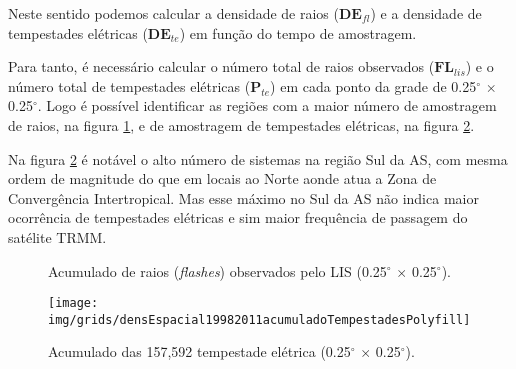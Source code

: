 
Neste sentido podemos calcular a densidade de raios ($\mathbf{DE}_{fl}$) e a densidade de tempestades elétricas ($\mathbf{DE}_{te}$) em função do tempo de amostragem.

Para tanto, é necessário calcular o número total de raios observados ($\mathbf{FL}_{lis}$) e o número total de tempestades elétricas ($\mathbf{P}_{te}$) em cada ponto da grade de 0.25$^{\circ}$ $\times$ 0.25$^{\circ}$. Logo é possível identificar as regiões com a maior número de amostragem de raios, na figura \ref{taxatotalraios}, e de amostragem de tempestades elétricas, na figura \ref{taxaTotalTe}.


Na figura \ref{taxaTotalTe} é notável o alto número de sistemas na região Sul da AS, com mesma ordem de magnitude do que em locais ao Norte aonde atua a Zona de Convergência Intertropical. Mas esse máximo no Sul da AS não indica maior ocorrência de tempestades elétricas e sim maior frequência de passagem do satélite TRMM. 


\begin{figure}[!ht]
  \centering
\caption{Acumulado de raios (\textit{flashes}) observados pelo LIS (0.25$^{\circ}$  $\times$ 0.25$^{\circ}$).}
\label{taxatotalraios}
\end{figure}   
  
\begin{figure}[!ht]
  \centering 
  {{\texttt{[image: img/grids/densEspacial19982011acumuladoTempestadesPolyfill]}}}
\caption{Acumulado das 157,592 tempestade elétrica (0.25$^{\circ}$  $\times$ 0.25$^{\circ}$).}
\label{taxaTotalTe}
\end{figure} 

